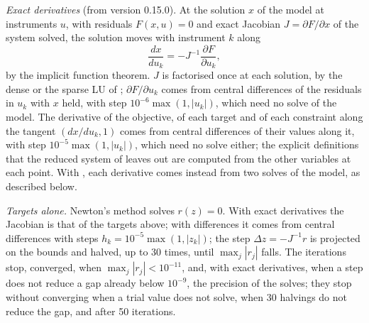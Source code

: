 \textit{Exact derivatives} (from version 0.15.0). At the solution $x$ of the
model at instruments $u$, with residuals $F(x, u) = 0$ and exact Jacobian
$J = \partial F/\partial x$ of the system solved, the solution moves with
instrument $k$ along
\begin{equation*}
\frac{dx}{du_k} = -J^{-1} \frac{\partial F}{\partial u_k},
\end{equation*}
by the implicit function theorem. $J$ is factorised once at each solution,
by the dense or the sparse LU of ; $\partial F/\partial
u_k$ comes from central differences of the residuals in $u_k$ with $x$ held,
with step $10^{-6}\max(1, |u_k|)$, which need no solve of the model. The
derivative of the objective, of each target and of each constraint along the
tangent $(dx/du_k, 1)$ comes from central differences of their values along
it, with step $10^{-5}\max(1, |u_k|)$, which need no solve either; the
explicit definitions that the reduced system of  leaves out
are computed from the other variables at each point. With , each derivative
comes instead from two solves of the model, as described below.

\textit{Targets alone.} Newton's method solves $r(z) = 0$. With exact
derivatives the Jacobian is that of the targets above; with differences it
comes from central differences with steps $h_k = 10^{-5}\max(1, |z_k|)$; the step
$\Delta z = -J^{-1} r$ is projected on the bounds and halved, up to 30 times,
until $\max_j |r_j|$ falls. The iterations stop, converged, when
$\max_j |r_j| < 10^{-11}$, and, with exact derivatives, when a step does not
reduce a gap already below $10^{-9}$, the precision of the solves; they stop
without converging when a trial value does not solve, when 30 halvings do
not reduce the gap, and after 50 iterations.

